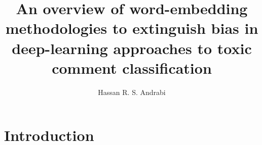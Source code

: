 \documentclass{article}
\title{An overview of word-embedding methodologies to extinguish bias in deep-learning approaches to toxic comment classification}
\author{Hassan R. S. Andrabi}
\date{}
\begin{document}
\maketitle
\thispagestyle{empty}

\begin{abstract}

\end{abstract}

\section{Introduction}\label{sec:introduction}

\end{document}

